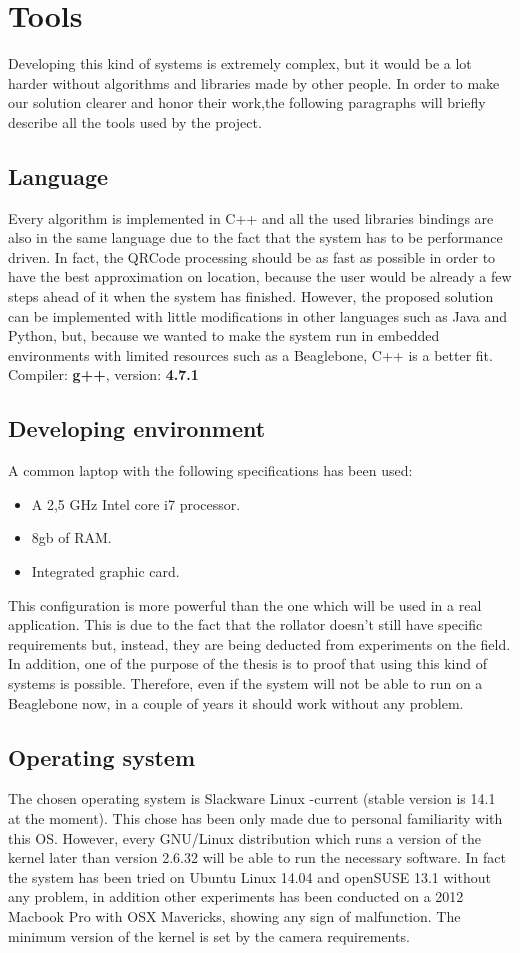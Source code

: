 \chapter{Tools}
Developing this kind of systems is extremely complex, but it would be a lot harder without algorithms and libraries made by other people.
In order to make our solution clearer and honor their work,the following paragraphs will briefly describe all the tools used by the project.

\section{Language}
Every algorithm is implemented in C++ and all the used libraries bindings are also in the same language due to the fact that the system has to be performance driven. In fact, the QRCode processing should be as fast as possible in order to have the best approximation on location, because the user would be already a few steps ahead of it when the system has finished. However, the proposed solution can be implemented with little modifications in other languages such as Java and Python, but, because we wanted to make the system run in embedded environments with limited resources such as a Beaglebone, C++ is a better fit.
\newline Compiler: \textbf{g++},  version: \textbf{4.7.1}


\section{Developing environment}
A common laptop with the following specifications has been used:
\begin{itemize}
  \item A 2,5 GHz Intel core i7 processor.
  \item 8gb of RAM.
  \item Integrated graphic card.
\end{itemize}
This configuration is more powerful than the one which will be used in a real application. This is due to the fact that the rollator doesn't still have specific requirements but, instead, they are being deducted from experiments on the field. In addition, one of the purpose of the thesis is to proof that using this kind of systems is possible. Therefore, even if the system will not be able to run on a Beaglebone now, in a couple of years it should work without any problem.

\section{Operating system}
The chosen operating system is Slackware Linux -current (stable version is 14.1 at the moment). This chose has been only made due to personal familiarity with this OS.
However, every GNU/Linux distribution which runs a version of the kernel later than version 2.6.32 will be able to run the necessary software. In fact the system has been tried on Ubuntu Linux 14.04 and openSUSE 13.1 without any problem, in addition other experiments has been conducted on a 2012 Macbook Pro with OSX Mavericks, showing any sign of malfunction. The minimum version of the kernel is set by the camera requirements.  


